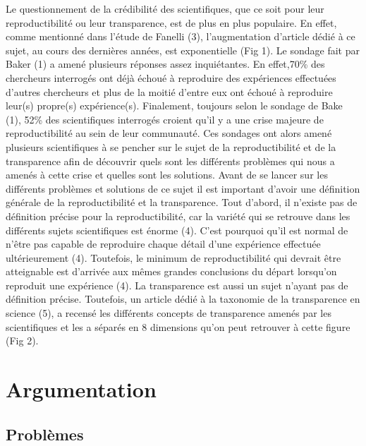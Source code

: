 \documentclass[9pt,twocolumn,twoside,]{pnas-new}
\begin{document}
Le questionnement de la crédibilité des scientifiques, que ce soit pour
leur reproductibilité ou leur transparence, est de plus en plus
populaire. En effet, comme mentionné dans l'étude de Fanelli (3),
l'augmentation d'article dédié à ce sujet, au cours des dernières
années, est exponentielle (Fig 1). Le sondage fait par Baker (1) a amené
plusieurs réponses assez inquiétantes. En effet,70\% des chercheurs
interrogés ont déjà échoué à reproduire des expériences effectuées
d'autres chercheurs et plus de la moitié d'entre eux ont échoué à
reproduire leur(s) propre(s) expérience(s). Finalement, toujours selon
le sondage de Bake (1), 52\% des scientifiques interrogés croient qu'il
y a une crise majeure de reproductibilité au sein de leur communauté.
Ces sondages ont alors amené plusieurs scientifiques à se pencher sur le
sujet de la reproductibilité et de la transparence afin de découvrir
quels sont les différents problèmes qui nous a amenés à cette crise et
quelles sont les solutions. Avant de se lancer sur les différents
problèmes et solutions de ce sujet il est important d'avoir une
définition générale de la reproductibilité et la transparence. Tout
d'abord, il n'existe pas de définition précise pour la reproductibilité,
car la variété qui se retrouve dans les différents sujets scientifiques
est énorme (4). C'est pourquoi qu'il est normal de n'être pas capable de
reproduire chaque détail d'une expérience effectuée ultérieurement (4).
Toutefois, le minimum de reproductibilité qui devrait être atteignable
est d'arrivée aux mêmes grandes conclusions du départ lorsqu'on
reproduit une expérience (4). La transparence est aussi un sujet n'ayant
pas de définition précise. Toutefois, un article dédié à la taxonomie de
la transparence en science (5), a recensé les différents concepts de
transparence amenés par les scientifiques et les a séparés en 8
dimensions qu'on peut retrouver à cette figure (Fig 2).

\hypertarget{argumentation}{%
\section*{Argumentation}\label{argumentation}}

\hypertarget{probluxe8mes}{%
\subsection*{Problèmes}\label{probluxe8mes}}
\end{document}
